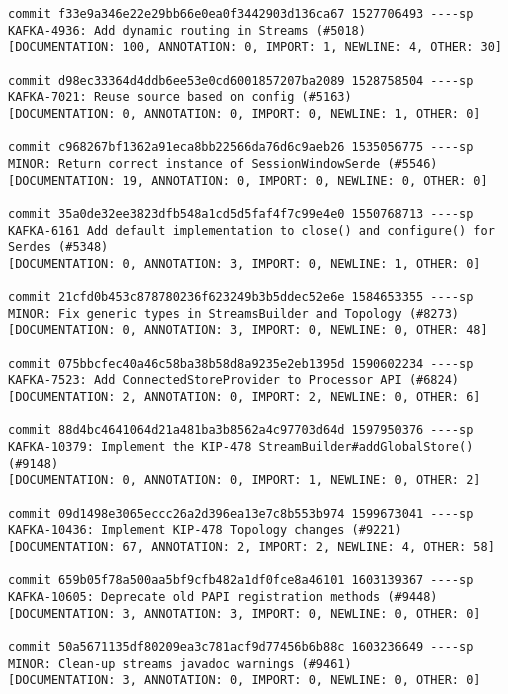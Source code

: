 \begin{lstlisting}
commit f33e9a346e22e29bb66e0ea0f3442903d136ca67 1527706493 ----sp 
KAFKA-4936: Add dynamic routing in Streams (#5018)                                                   
[DOCUMENTATION: 100, ANNOTATION: 0, IMPORT: 1, NEWLINE: 4, OTHER: 30]

commit d98ec33364d4ddb6ee53e0cd6001857207ba2089 1528758504 ----sp 
KAFKA-7021: Reuse source based on config (#5163)                                                     
[DOCUMENTATION: 0, ANNOTATION: 0, IMPORT: 0, NEWLINE: 1, OTHER: 0]

commit c968267bf1362a91eca8bb22566da76d6c9aeb26 1535056775 ----sp 
MINOR: Return correct instance of SessionWindowSerde (#5546)                                         
[DOCUMENTATION: 19, ANNOTATION: 0, IMPORT: 0, NEWLINE: 0, OTHER: 0]

commit 35a0de32ee3823dfb548a1cd5d5faf4f7c99e4e0 1550768713 ----sp 
KAFKA-6161 Add default implementation to close() and configure() for Serdes (#5348)                  
[DOCUMENTATION: 0, ANNOTATION: 3, IMPORT: 0, NEWLINE: 1, OTHER: 0]

commit 21cfd0b453c878780236f623249b3b5ddec52e6e 1584653355 ----sp 
MINOR: Fix generic types in StreamsBuilder and Topology (#8273)                                      
[DOCUMENTATION: 0, ANNOTATION: 3, IMPORT: 0, NEWLINE: 0, OTHER: 48]

commit 075bbcfec40a46c58ba38b58d8a9235e2eb1395d 1590602234 ----sp 
KAFKA-7523: Add ConnectedStoreProvider to Processor API (#6824)                                      
[DOCUMENTATION: 2, ANNOTATION: 0, IMPORT: 2, NEWLINE: 0, OTHER: 6]

commit 88d4bc4641064d21a481ba3b8562a4c97703d64d 1597950376 ----sp 
KAFKA-10379: Implement the KIP-478 StreamBuilder#addGlobalStore() (#9148)                            
[DOCUMENTATION: 0, ANNOTATION: 0, IMPORT: 1, NEWLINE: 0, OTHER: 2]

commit 09d1498e3065eccc26a2d396ea13e7c8b553b974 1599673041 ----sp 
KAFKA-10436: Implement KIP-478 Topology changes (#9221)                                              
[DOCUMENTATION: 67, ANNOTATION: 2, IMPORT: 2, NEWLINE: 4, OTHER: 58]

commit 659b05f78a500aa5bf9cfb482a1df0fce8a46101 1603139367 ----sp 
KAFKA-10605: Deprecate old PAPI registration methods (#9448)                                         
[DOCUMENTATION: 3, ANNOTATION: 3, IMPORT: 0, NEWLINE: 0, OTHER: 0]

commit 50a5671135df80209ea3c781acf9d77456b6b88c 1603236649 ----sp 
MINOR: Clean-up streams javadoc warnings (#9461)                                                     
[DOCUMENTATION: 3, ANNOTATION: 0, IMPORT: 0, NEWLINE: 0, OTHER: 0]


\end{lstlisting}
